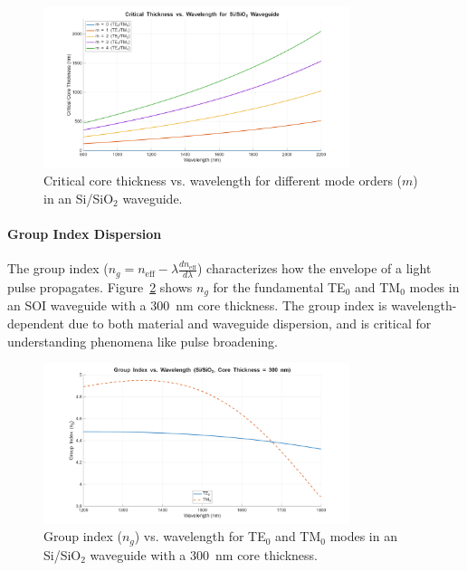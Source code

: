 \documentclass[10pt, a4paper]{article}
\begin{document}
\begin{figure}[h!]
    \centering
    \includegraphics[width=0.8\textwidth]{task1/critical_thickness_vs_wavelength.png}
    \caption{Critical core thickness vs. wavelength for different mode orders ($m$) in an Si/SiO$_2$ waveguide.}
    \label{fig:critical_thickness_vs_wavelength}
\end{figure}

\paragraph{Group Index Dispersion}
The group index ($n_g = n_{\text{eff}} - \lambda \frac{dn_{\text{eff}}}{d\lambda}$) characterizes how the envelope of a light pulse propagates. Figure~\ref{fig:group_index_TE0_TM0_vs_wavelength} shows $n_g$ for the fundamental TE$_0$ and TM$_0$ modes in an SOI waveguide with a 300~nm core thickness. The group index is wavelength-dependent due to both material and waveguide dispersion, and is critical for understanding phenomena like pulse broadening.

\begin{figure}[h!]
    \centering
    \includegraphics[width=0.8\textwidth]{task1/group_index_TE0_TM0_vs_wavelength_d300nm.png}
    \caption{Group index ($n_g$) vs. wavelength for TE$_0$ and TM$_0$ modes in an Si/SiO$_2$ waveguide with a 300~nm core thickness.}
    \label{fig:group_index_TE0_TM0_vs_wavelength}
\end{figure}
\end{document}
